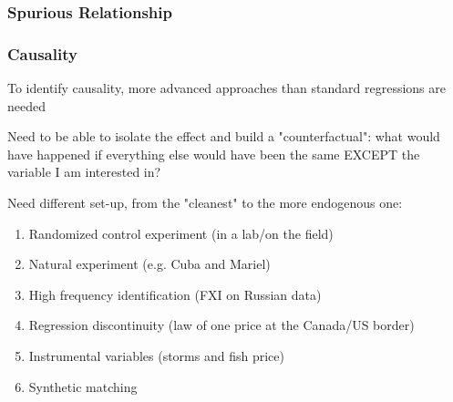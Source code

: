 \documentclass{beamer}
\newenvironment{wideitemize}{\itemize\addtolength{\itemsep}{10pt}}{\enditemize}
\begin{document}
\begin{frame}
\frametitle{Spurious Relationship}
\end{frame}



\begin{frame}
  \frametitle{Causality}

  \begin{wideitemize}
  \item To identify causality, more advanced approaches than standard regressions are needed
  \item Need to be able to isolate the effect and build a "counterfactual": what would have happened if everything else would have been the same EXCEPT the variable I am interested in?
  \item Need different set-up, from the "cleanest" to the more endogenous one:
    \begin{enumerate}
    \item Randomized control experiment (in a lab/on the field)
    \item Natural experiment (e.g. Cuba and Mariel)
    \item High frequency identification (FXI on Russian data)
    \item Regression discontinuity (law of one price at the Canada/US border)
    \item Instrumental variables (storms and fish price)
    \item Synthetic matching
    \end{enumerate}
    
  \end{wideitemize}
\end{frame}
\end{document}
